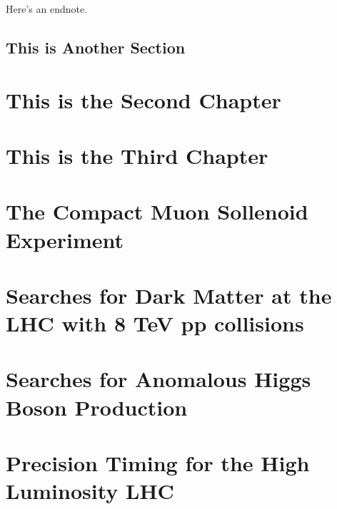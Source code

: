 \documentclass[12pt]{caltech_thesis}
\begin{document}
\lipsum[3] 

\lipsum[4-5] 

Here's an endnote.

\section{This is Another Section}
\lipsum[6-7] 

\chapter{This is the Second Chapter}





\chapter{This is the Third Chapter}



\chapter{The Compact Muon Sollenoid Experiment}


\chapter{Searches for Dark Matter at the LHC with 8 TeV pp collisions}

\chapter{Searches for Anomalous Higgs Boson Production}

\chapter{Precision Timing for the High Luminosity LHC}

\end{document}

